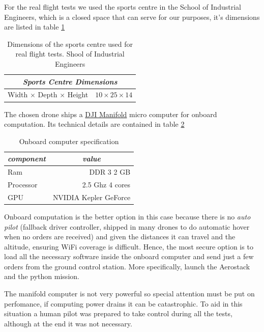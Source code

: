     For the real flight tests we used the sports centre in the School of Industrial Engineers, which is a closed space that can serve for our purposes, it's dimensions are listed in table \ref{ch_5:table:sports_dims}

    \begin{table}[!h]
      \centering
      \begin{tabular}{lr} \toprule
        \multicolumn{2}{c}{\textit{Sports Centre Dimensions}}        \\ \midrule
        Width $\times$ Depth $\times$ Height & $10 \times 25 \times 14$ \\ \bottomrule
        \hline
      \end{tabular}
      \caption{Dimensions of the sports centre used for real flight tests. Shool of Industrial Engineers}
      \label{ch_5:table:sports_dims}
    \end{table}

    The chosen drone ships a \href{https://www.dji.com/es/manifold}{DJI Manifold} micro computer for onboard computation. Its technical details are contained in table \ref{ch_5:table:manifold_specs}

    \begin{table}[!h]
      \centering
      \begin{tabular}{lr} \toprule
        \multicolumn{1}{c}{\textit{component}} & \multicolumn{1}{c}{\textit{value}}   \\ \midrule
        Ram           & DDR 3 2 GB     \\
        Processor     & 2.5 Ghz 4 cores \\
        GPU           & NVIDIA Kepler GeForce \\ \bottomrule
        \hline
      \end{tabular}
      \caption{Onboard computer specification}
      \label{ch_5:table:manifold_specs}
    \end{table}

    Onboard computation is the better option in this case because there is no \textit{auto pilot} (fallback driver controller, shipped in many drones to do automatic hover when no orders are received) and given the distances it can travel and the altitude, ensuring WiFi coverage is difficult. Hence, the most secure option is to load all the necessary software inside the onboard computer and send just a few orders from the ground control station. More specifically, launch the Aerostack and the python mission.

    The manifold computer is not very powerful so special attention must be put on perfomance, if computing power drains it can be catastrophic. To aid in this situation a human pilot was prepared to take control during all the tests, although at the end it was not necessary.

